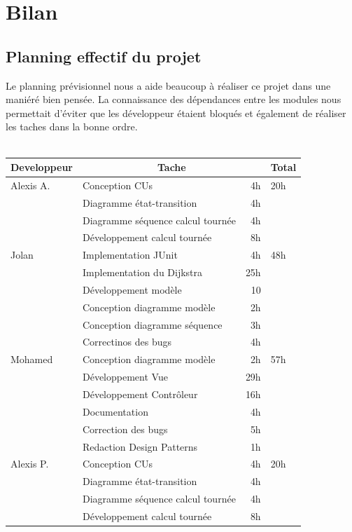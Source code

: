 \documentclass[10pt,a4paper]{book}
\begin{document}
\chapter{Bilan}
\section{Planning effectif du projet}
Le planning prévisionnel nous a aide beaucoup à réaliser ce projet dans une maniéré bien pensée. La connaissance des dépendances entre les modules nous permettait d'éviter que les développeur étaient bloqués et également de réaliser les taches dans la bonne ordre.\\\\
\begin{longtable}{|l|l|r|l|}
\hline
\textbf{Developpeur}&\multicolumn{2}{c|}{\textbf{Tache}}&\textbf{Total}\\
\hline

\hline
Alexis A. & Conception CUs & 4h & 20h\\
\cline{2-3}
& Diagramme état-transition & 4h & ~\\
\cline{2-3}
& Diagramme séquence calcul tournée & 4h & ~\\
\cline{2-3}
& Développement calcul tournée & 8h & ~\\
\hline

\hline
Jolan & Implementation JUnit & 4h & 48h\\
\cline{2-3}
& Implementation du Dijkstra & 25h & ~\\
\cline{2-3}
& Développement modèle & 10 & ~\\
\cline{2-3}
& Conception diagramme modèle & 2h & ~\\
\cline{2-3}
& Conception diagramme séquence & 3h & ~\\
\cline{2-3}
& Correctinos des bugs & 4h & ~\\
\hline

\hline
Mohamed & Conception diagramme modèle & 2h & 57h\\
\cline{2-3}
& Développement Vue & 29h & ~\\
\cline{2-3}
& Développement Contrôleur & 16h & ~\\
\cline{2-3}
& Documentation & 4h & ~\\
\cline{2-3}
& Correction des bugs & 5h & ~\\
\cline{2-3}
& Redaction Design Patterns & 1h & ~\\
\hline

\hline
Alexis P. & Conception CUs & 4h & 20h\\
\cline{2-3}
& Diagramme état-transition & 4h & ~\\
\cline{2-3}
& Diagramme séquence calcul tournée & 4h & ~\\
\cline{2-3}
& Développement calcul tournée & 8h & ~\\
\hline


\end{longtable}
\end{document}
